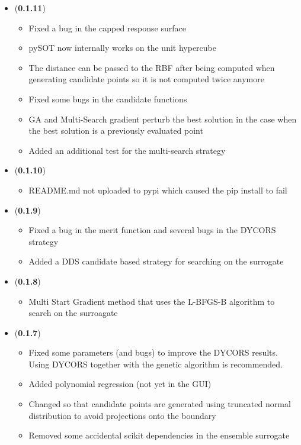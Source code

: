 \documentclass[]{article}
\begin{document}
\begin{itemize}
	\item (\textbf{0.1.11}) 
	\begin{itemize}
		\item Fixed a bug in the capped response surface
		\item pySOT now internally works on the unit hypercube
		\item The distance can be passed to the RBF after being computed when generating candidate points 
		so it is not computed twice anymore
		\item Fixed some bugs in the candidate functions
		\item GA and Multi-Search gradient perturb the best solution in the case when the best solution is a 
		previously evaluated point
		\item Added an additional test for the multi-search strategy
	\end{itemize}

	\item (\textbf{0.1.10}) 
	\begin{itemize}
		\item README.md not uploaded to pypi which caused the pip install to fail
	\end{itemize}

	\item (\textbf{0.1.9}) 
	\begin{itemize}
		\item Fixed a bug in the merit function and several bugs in the DYCORS strategy
		\item Added a DDS candidate based strategy for searching on the surrogate
	\end{itemize}

	\item (\textbf{0.1.8}) 
	\begin{itemize}
		\item Multi Start Gradient method that uses the L-BFGS-B algorithm to search on the surroagate
	\end{itemize}

	\item (\textbf{0.1.7}) 
	\begin{itemize}
		\item Fixed some parameters (and bugs) to improve the DYCORS results. Using DYCORS together 
		with the genetic algorithm is recommended.
		\item Added polynomial regression (not yet in the GUI)
		\item Changed so that candidate points are generated using truncated normal distribution to avoid 
		projections onto the boundary
		\item Removed some accidental scikit dependencies in the ensemble surrogate
	\end{itemize}


\end{itemize}
\end{document}
